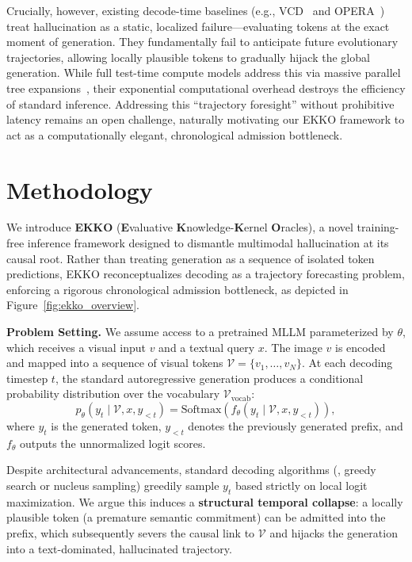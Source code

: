 Crucially, however, existing decode-time baselines (e.g., VCD~\cite{leng2023mitigating} and OPERA~\cite{huang2024opera_cvpr}) treat hallucination as a static, localized failure---evaluating tokens at the exact moment of generation. They fundamentally fail to anticipate future evolutionary trajectories, allowing locally plausible tokens to gradually hijack the global generation. While full test-time compute models address this via massive parallel tree expansions~\cite{jang2026contextvla}, their exponential computational overhead destroys the efficiency of standard inference. Addressing this ``trajectory foresight'' without prohibitive latency remains an open challenge, naturally motivating our EKKO framework to act as a computationally elegant, chronological admission bottleneck.

\section{Methodology}
\label{sec:Methodology}

We introduce \textbf{EKKO} (\textbf{E}valuative \textbf{K}nowledge-\textbf{K}ernel \textbf{O}racles), a novel training-free inference framework designed to dismantle multimodal hallucination at its causal root. Rather than treating generation as a sequence of isolated token predictions, EKKO reconceptualizes decoding as a trajectory forecasting problem, enforcing a rigorous chronological admission bottleneck, as depicted in Figure~\ref{fig:ekko_overview}.

\label{fig:ekko_overview}

\noindent\textbf{Problem Setting.} We assume access to a pretrained MLLM parameterized by $\theta$, which receives a visual input $v$ and a textual query $x$. The image $v$ is encoded and mapped into a sequence of visual tokens $\mathcal{V} = \{v_1, \dots, v_N\}$. At each decoding timestep $t$, the standard autoregressive generation produces a conditional probability distribution over the vocabulary $\mathcal{V}_{\mathrm{vocab}}$:
\begin{equation}
    p_\theta(y_t \mid \mathcal{V}, x, y_{<t}) = \text{Softmax}\!\left(f_\theta(y_t \mid \mathcal{V}, x, y_{<t})\right),
\end{equation}
where $y_t$ is the generated token, $y_{<t}$ denotes the previously generated prefix, and $f_\theta$ outputs the unnormalized logit scores.

Despite architectural advancements, standard decoding algorithms (\eg, greedy search or nucleus sampling) greedily sample $y_t$ based strictly on local logit maximization. We argue this induces a \textbf{structural temporal collapse}: a locally plausible token (a premature semantic commitment) can be admitted into the prefix, which subsequently severs the causal link to $\mathcal{V}$ and hijacks the generation into a text-dominated, hallucinated trajectory.

